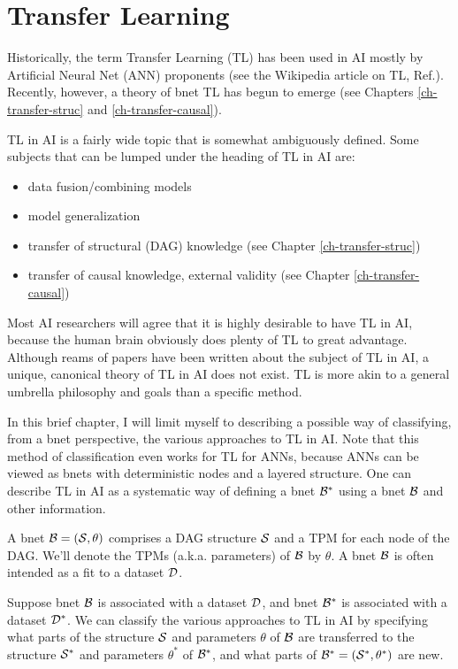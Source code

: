\chapter{Transfer Learning}
\label{ch-transfer}

Historically,
the term Transfer Learning (TL)
has been used in AI mostly by Artificial Neural Net (ANN)
proponents (see the Wikipedia article on TL,
 Ref.\cite{wiki-TL}).
Recently, however,
 a theory of bnet TL
has begun to emerge
(see Chapters \ref{ch-transfer-struc} and
\ref{ch-transfer-causal}).

TL in AI is a
fairly wide topic that 
is somewhat ambiguously defined.
Some subjects that can be lumped
under the heading of TL in AI are:
\begin{itemize}
\item data fusion/combining models
\item model generalization
\item transfer of 
structural (DAG) knowledge
(see Chapter \ref{ch-transfer-struc})
\item transfer of 
causal knowledge, external validity
(see Chapter \ref{ch-transfer-causal})
\end{itemize}


Most AI researchers
will agree that it is highly desirable 
to have TL in AI, because the human 
brain obviously does  plenty of TL
to great advantage.
Although reams of papers 
have been written about the subject of TL in AI,
a unique, canonical theory of TL in AI
does not exist. TL is more akin to a
general umbrella philosophy and goals than a specific method.


In this brief chapter, I will
limit myself to describing a possible way of
 classifying,
from a bnet perspective, the 
various approaches to TL
in AI.
Note that this method of classification
even works for TL for ANNs,
because ANNs can be
viewed as bnets with deterministic nodes
and a layered structure.
One can describe TL in AI as 
a systematic way 
of  defining a bnet 
${\cal B}^*$ 
using a bnet 
${\cal B}$
and other information.

A bnet ${\cal B}=({\cal S}, \theta)$ comprises
a DAG structure ${\cal S}$ and 
a TPM for each node of the DAG. We'll denote
the TPMs (a.k.a. parameters) of ${\cal B}$ by $\theta$. A bnet ${\cal B}$ is often intended as a fit to a dataset ${\cal D}$.

Suppose bnet ${\cal B}$ is associated with a dataset ${\cal D}$,
and bnet ${\cal B}^*$
is associated with a dataset ${\cal D}^*$.
We can
classify the various approaches to TL in AI 
by specifying what parts
of the structure ${\cal S}$ and parameters $\theta$
of ${\cal B}$
are transferred to the structure
${\cal S}^*$ and parameters $\theta^*$
of ${\cal B}^*$, and what parts of 
${\cal B}^*=({\cal S}^*, \theta^*)$ are new.

